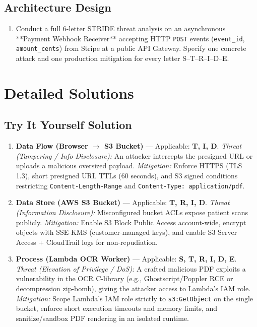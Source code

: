 \subsection*{Architecture Design}
\begin{enumerate}[label=\textbf{Exercise~\thechapter.\arabic*}, leftmargin=*, start=4]
  \item Conduct a full 6-letter STRIDE threat analysis on an asynchronous **Payment Webhook Receiver** accepting HTTP \texttt{POST} events (\texttt{event\_id}, \texttt{amount\_cents}) from Stripe at a public API Gateway. Specify one concrete attack and one production mitigation for every letter S--T--R--I--D--E.
\end{enumerate}

\section{Detailed Solutions}

\subsection*{Try It Yourself Solution}
\begin{enumerate}[leftmargin=18pt]
  \item \textbf{Data Flow (Browser $\rightarrow$ S3 Bucket)} --- Applicable: \textbf{T, I, D}.
  \emph{Threat (Tampering / Info Disclosure):} An attacker intercepts the presigned URL or uploads a malicious oversized payload. \emph{Mitigation:} Enforce HTTPS (TLS 1.3), short presigned URL TTLs (60 seconds), and S3 signed conditions restricting \texttt{Content-Length-Range} and \texttt{Content-Type: application/pdf}.
  \item \textbf{Data Store (AWS S3 Bucket)} --- Applicable: \textbf{T, R, I, D}.
  \emph{Threat (Information Disclosure):} Misconfigured bucket ACLs expose patient scans publicly. \emph{Mitigation:} Enable S3 Block Public Access account-wide, encrypt objects with SSE-KMS (customer-managed keys), and enable S3 Server Access + CloudTrail logs for non-repudiation.
  \item \textbf{Process (Lambda OCR Worker)} --- Applicable: \textbf{S, T, R, I, D, E}.
  \emph{Threat (Elevation of Privilege / DoS):} A crafted malicious PDF exploits a vulnerability in the OCR C-library (e.g., Ghostscript/Poppler RCE or decompression zip-bomb), giving the attacker access to Lambda's IAM role. \emph{Mitigation:} Scope Lambda's IAM role strictly to \texttt{s3:GetObject} on the single bucket, enforce short execution timeouts and memory limits, and sanitize/sandbox PDF rendering in an isolated runtime.
\end{enumerate}

